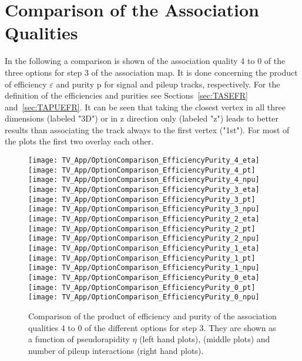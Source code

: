 \chapter{Comparison of the Association Qualities\label{sec:TrackAss_App} }

In the following a comparison is shown of the association quality 4 to 0 of the three options for step 3 of the association map. It is done concerning the product of efficiency $\varepsilon$ and purity p for signal and pileup tracks, respectively. For the definition of the efficiencies and purities see Sections~\ref{sec:TASEFR} and~\ref{sec:TAPUEFR}. It can be seen that taking the closest vertex in all three dimensions (labeled "3D") or in z direction only (labeled "z") leads to better results than associating the track always to the first vertex ("1st"). For most of the plots the first two overlay each other.

\begin{figure}[!h]
  \centering
  \texttt{[image: TV\_App/OptionComparison\_EfficiencyPurity\_4\_eta]}
  \texttt{[image: TV\_App/OptionComparison\_EfficiencyPurity\_4\_pt]}
  \texttt{[image: TV\_App/OptionComparison\_EfficiencyPurity\_4\_npu]}
  \\
  \texttt{[image: TV\_App/OptionComparison\_EfficiencyPurity\_3\_eta]}
  \texttt{[image: TV\_App/OptionComparison\_EfficiencyPurity\_3\_pt]}
  \texttt{[image: TV\_App/OptionComparison\_EfficiencyPurity\_3\_npu]}
  \\
  \texttt{[image: TV\_App/OptionComparison\_EfficiencyPurity\_2\_eta]}
  \texttt{[image: TV\_App/OptionComparison\_EfficiencyPurity\_2\_pt]}
  \texttt{[image: TV\_App/OptionComparison\_EfficiencyPurity\_2\_npu]}
  \\
  \texttt{[image: TV\_App/OptionComparison\_EfficiencyPurity\_1\_eta]}
  \texttt{[image: TV\_App/OptionComparison\_EfficiencyPurity\_1\_pt]}
  \texttt{[image: TV\_App/OptionComparison\_EfficiencyPurity\_1\_npu]}
  \\
  \texttt{[image: TV\_App/OptionComparison\_EfficiencyPurity\_0\_eta]}
  \texttt{[image: TV\_App/OptionComparison\_EfficiencyPurity\_0\_pt]}
  \texttt{[image: TV\_App/OptionComparison\_EfficiencyPurity\_0\_npu]}
  \\
\caption[Comparison of the association qualities 4 to 0 of the different options for step 3 of the association map]{Comparison of the product of efficiency and purity of the association qualities 4 to 0 of the different options for step 3. They are shown as a function of pseudorapidity $\eta$ (left hand plots), \pt{} (middle plots) and number of pileup interactions (right hand plots). \label{sec:TrackAss_AppSignal}}
\end{figure}


